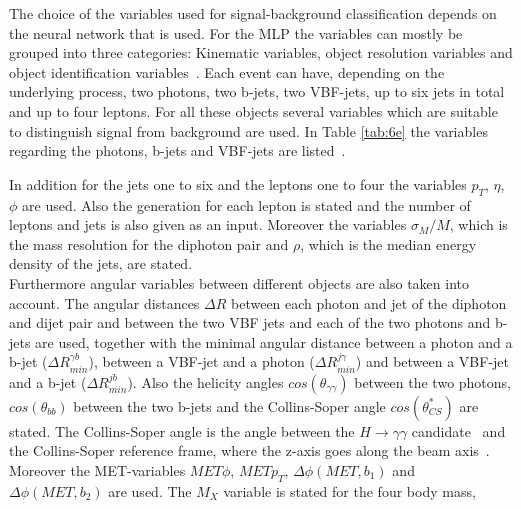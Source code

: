 The choice of the variables used for signal-background classification depends on the neural network that is used. For the MLP the variables can mostly be grouped into three
categories: Kinematic variables, object resolution variables and object identification variables~\cite{CMS:2021qbp}. Each event can have, depending on the underlying process, two photons, two b-jets,
two VBF-jets, up to six jets in total and up to four leptons. For all these objects several variables which are suitable to distinguish signal from background are used.
In Table \ref{tab:6e} the variables regarding the photons, b-jets and VBF-jets are listed~\cite{Run2analysisnote}.


In addition for the jets one to six and the leptons one to four the variables $p_T$, $\eta$, $\phi$ are used. Also the generation for each lepton is stated and the number of leptons and jets is
also given as an input. Moreover the variables $\sigma_M/M$, which is the mass resolution for the diphoton pair and $\rho$, which is the median energy density of the jets, are stated. \\

Furthermore angular variables between different objects are also taken into account. The angular distances $\Delta R$ between each photon and jet of the diphoton and dijet pair 
and between the two VBF jets and each of the two photons and b-jets are used, together with the minimal angular distance between a photon and a b-jet ($\Delta R_{min}^{\gamma b}$), between a VBF-jet and a photon
($\Delta R_{min}^{j \gamma}$) and between a VBF-jet and a b-jet ($\Delta R_{min}^{j b}$).
Also the helicity angles $cos(\theta_{\gamma \gamma})$ between the two photons, $cos(\theta_{bb})$ between the two b-jets and the Collins-Soper angle $cos(\theta_{CS}^*)$ are stated.
The Collins-Soper angle is the angle between the $H \rightarrow \gamma \gamma$ candidate~\cite{Run2analysisnote} and the Collins-Soper reference frame, where the z-axis goes along the beam axis~\cite{CSangle}.
Moreover the MET-variables $MET \phi$, $MET p_T$, $\Delta \phi (MET, b_1)$ and $\Delta \phi (MET, b_2)$ are used. The $M_X$ variable is stated for the four body mass,


